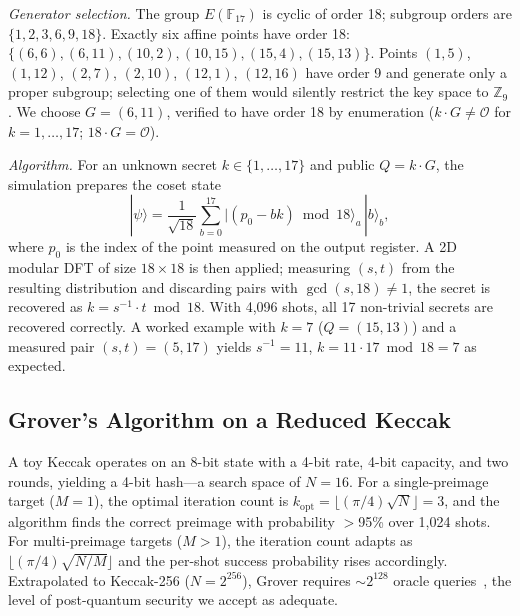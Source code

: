 \documentclass[journal,onecolumn,11pt]{IEEEtran}
\begin{document}
\textit{Generator selection.} The group $E(\mathbb{F}_{17})$ is cyclic of order 18; subgroup orders are $\{1, 2, 3, 6, 9, 18\}$. Exactly six affine points have order 18: $\{(6,6), (6,11), (10,2), (10,15), (15,4), (15,13)\}$. Points $(1,5)$, $(1,12)$, $(2,7)$, $(2,10)$, $(12,1)$, $(12,16)$ have order 9 and generate only a proper subgroup; selecting one of them would silently restrict the key space to $\mathbb{Z}_9$. We choose $G = (6, 11)$, verified to have order 18 by enumeration ($k \cdot G \neq \mathcal{O}$ for $k = 1, \ldots, 17$; $18 \cdot G = \mathcal{O}$).

\textit{Algorithm.} For an unknown secret $k \in \{1, \ldots, 17\}$ and public $Q = k \cdot G$, the simulation prepares the coset state
\begin{equation}
|\psi\rangle = \frac{1}{\sqrt{18}}\sum_{b=0}^{17} \bigl|(p_0 - b k) \bmod 18\bigr\rangle_a \,|b\rangle_b,
\label{eq:coset}
\end{equation}
where $p_0$ is the index of the point measured on the output register. A 2D modular DFT of size $18 \times 18$ is then applied; measuring $(s, t)$ from the resulting distribution and discarding pairs with $\gcd(s, 18) \neq 1$, the secret is recovered as $k = s^{-1} \cdot t \bmod 18$. With 4{,}096 shots, all 17 non-trivial secrets are recovered correctly. A worked example with $k = 7$ ($Q = (15, 13)$) and a measured pair $(s, t) = (5, 17)$ yields $s^{-1} = 11$, $k = 11 \cdot 17 \bmod 18 = 7$ as expected.

\subsection{Grover's Algorithm on a Reduced Keccak}
\label{sec:quantum_grover}

A toy Keccak operates on an 8-bit state with a 4-bit rate, 4-bit capacity, and two rounds, yielding a 4-bit hash---a search space of $N = 16$. For a single-preimage target ($M = 1$), the optimal iteration count is $k_{\text{opt}} = \lfloor (\pi/4)\sqrt{N} \rfloor = 3$, and the algorithm finds the correct preimage with probability $>$95\% over 1{,}024 shots. For multi-preimage targets ($M > 1$), the iteration count adapts as $\lfloor (\pi/4)\sqrt{N/M} \rfloor$ and the per-shot success probability rises accordingly. Extrapolated to Keccak-256 ($N = 2^{256}$), Grover requires $\sim 2^{128}$ oracle queries~\cite{luo2024keccakquantum}, the level of post-quantum security we accept as adequate.

\end{document}
